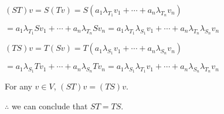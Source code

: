 \documentclass[fleqn]{article}
\begin{document}
\begin{enumerate}[nolistsep]
			$(ST)v = S(Tv) = S(a_1\lambda_{T_1}v_1 + \cdots + a_n\lambda_{T_n}v_n)$
			
			$ = a_1\lambda_{T_1}Sv_1 + \cdots + a_n\lambda_{T_n}Sv_n = a_1\lambda_{T_1}\lambda_{S_1}v_1 + \cdots + a_n\lambda_{T_n}\lambda_{S_n}v_n$
			
			\pagebreak
			$(TS)v = T(Sv) = T(a_1\lambda_{S_1}v_1 + \cdots + a_n\lambda_{S_n}v_n)$
			
			$ = a_1\lambda_{S_1}Tv_1 + \cdots + a_n\lambda_{S_n}Tv_n = a_1\lambda_{S_1}\lambda_{T_1}v_1 + \cdots + a_n\lambda_{S_n}\lambda_{T_n}v_n$
			
			For any $v \in V$, $(ST)v = (TS)v$.
			
			$\therefore$ we can conclude that $ST = TS$.			
		\end{enumerate}	
\end{document}
